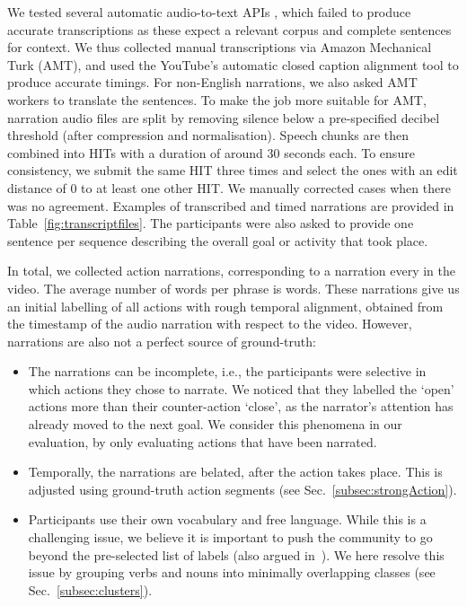\documentclass[runningheads]{llncs}
\begin{document}
We tested several automatic audio-to-text APIs \cite{googleSpeechApi,ibmWatson,cmuSphinx}, which failed to produce accurate transcriptions as these expect a relevant corpus and complete sentences for context. We thus collected manual transcriptions via Amazon Mechanical Turk (AMT), and used the YouTube's automatic closed caption alignment tool to produce accurate timings. For non-English narrations, we also asked AMT workers to translate the sentences. 
To make the job more suitable for AMT, narration audio files are split by removing silence below a pre-specified decibel threshold (after compression and normalisation).  Speech chunks are then combined into HITs with a duration of around 30 seconds each.
To ensure consistency, we submit the same HIT three times and select the ones with an edit distance of 0 to at least one other HIT. We manually corrected cases when there was no agreement. Examples of transcribed and timed narrations are provided in Table~\ref{fig:transcriptfiles}.
The participants were also asked to provide one sentence per sequence describing the overall goal or activity that took place. 

In total, we collected  action narrations, corresponding to a narration every  in the video. The average number of words per phrase is  words.
These narrations give us an initial labelling of all actions with rough temporal alignment, obtained from the timestamp of the audio narration with respect to the video. However, narrations are also not a perfect source of ground-truth:

\begin{itemize}[leftmargin=*]
\item The narrations can be incomplete, i.e., the participants were selective in which actions they chose to narrate. We noticed that they labelled the `open' actions more than their counter-action `close', as the narrator's attention has already moved to the next goal. We consider this phenomena in our evaluation, by only evaluating actions that have been narrated.

\item Temporally, 
the narrations are belated, after the action takes place. This is adjusted using ground-truth action segments (see Sec.~\ref{subsec:strongAction}).
\item Participants use their own vocabulary and free language. While this is a challenging issue, we believe it is important to push the community to go beyond the pre-selected list of labels (also argued in~\cite{ade}). We here resolve this issue by grouping verbs and nouns into minimally overlapping classes (see Sec.~\ref{subsec:clusters}).
\end{itemize}
\end{document}
